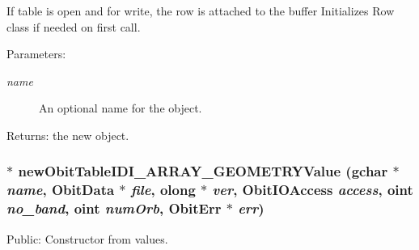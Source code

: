 If table is open and for write, the row is attached to the buffer Initializes Row class if needed on first call. \begin{Desc}
\item[Parameters:]
\begin{description}
\item[{\em name}]An optional name for the object. \end{description}
\end{Desc}
\begin{Desc}
\item[Returns:]the new object. \end{Desc}
\subsubsection{$\ast$ new\-Obit\-Table\-IDI\_\-ARRAY\_\-GEOMETRYValue (gchar $\ast$ {\em name}, {\bf Obit\-Data} $\ast$ {\em file}, {\bf olong} $\ast$ {\em ver}, Obit\-IOAccess {\em access}, {\bf oint} {\em no\_\-band}, {\bf oint} {\em num\-Orb}, {\bf Obit\-Err} $\ast$ {\em err})}\label{ObitTableIDI__ARRAY__GEOMETRY_8c_a18}


Public: Constructor from values. 

